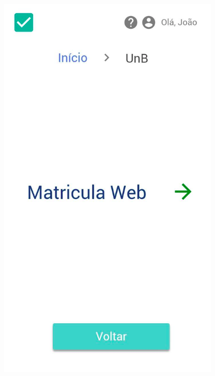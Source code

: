 \begin{figure}[h!]
{      \includegraphics[keepaspectratio=true, scale=0.2]{figuras/mob12.png}
   }
    
\end{figure}

